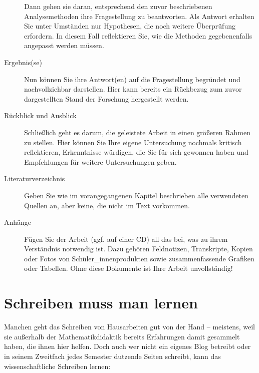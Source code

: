 \documentclass[ngerman,bibliography=totoc,oneside,12pt,a4paper]{scrbook}
\begin{document}
\begin{description}
Dann gehen sie daran, entsprechend den zuvor beschriebenen
Analysemethoden ihre Fragestellung zu beantworten. Als Antwort erhalten
Sie unter Umständen nur Hypothesen, die noch weitere Überprüfung
erfordern. In diesem Fall reflektieren Sie, wie die Methoden
gegebenenfalls angepasst werden müssen.
\item[Ergebnis(se)]
Nun können Sie ihre Antwort(en) auf die Fragestellung begründet und
nachvollziehbar darstellen. Hier kann bereits ein Rückbezug zum zuvor
dargestellten Stand der Forschung hergestellt werden.
\item[Rückblick und Ausblick]
Schließlich geht es darum, die geleistete Arbeit in einen größeren
Rahmen zu stellen. Hier können Sie Ihre eigene Untersuchung nochmals
kritisch reflektieren, Erkenntnisse würdigen, die Sie für sich gewonnen
haben und Empfehlungen für weitere Untersuchungen geben.
\item[Literaturverzeichnis]
Geben Sie wie im vorangegangenen Kapitel beschrieben alle verwendeten
Quellen an, aber keine, die nicht im Text vorkommen.
\item[Anhänge]
Fügen Sie der Arbeit (ggf. auf einer CD) all das bei, was zu ihrem
Verständnis notwendig ist. Dazu gehören Feldnotizen, Transkripte, Kopien
oder Fotos von Schüler\_innenprodukten sowie zusammenfassende Grafiken
oder Tabellen. Ohne diese Dokumente ist Ihre Arbeit unvollständig!
\end{description}

\section{Schreiben muss man lernen}\label{schreiben-muss-man-lernen}

Manchen geht das Schreiben von Hausarbeiten gut von der Hand --
meistens, weil sie außerhalb der Mathematikdidaktik bereits Erfahrungen
damit gesammelt haben, die ihnen hier helfen. Doch auch wer nicht ein
eigenes Blog betreibt oder in seinem Zweitfach jedes Semester dutzende
Seiten schreibt, kann das wissenschaftliche Schreiben lernen:
\end{document}
